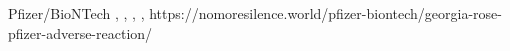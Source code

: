           {}
          {}
          {Pfizer/BioNTech}
          {}
          {
            ,
            ,
            ,
            ,
          }
          {https://nomoresilence.world/pfizer-biontech/georgia-rose-pfizer-adverse-reaction/}

